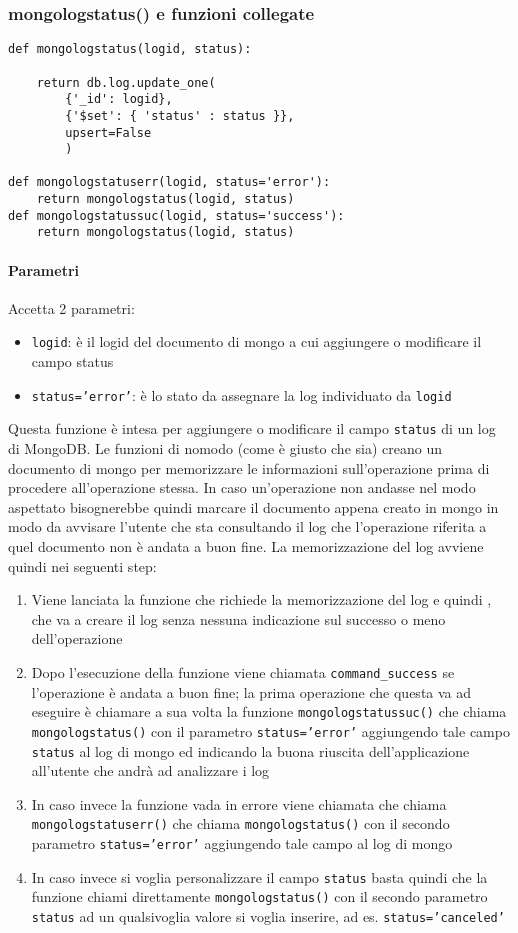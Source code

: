 \documentclass[11pt]{article}
\begin{document}
\subsubsection{mongologstatus() e funzioni collegate }\label{mongologstatus}
\begin{lstlisting}
def mongologstatus(logid, status):

    return db.log.update_one(
        {'_id': logid},
        {'$set': { 'status' : status }},
        upsert=False
        )
	
def mongologstatuserr(logid, status='error'):
    return mongologstatus(logid, status)
def mongologstatussuc(logid, status='success'):
    return mongologstatus(logid, status)
\end{lstlisting}
\paragraph{Parametri}
Accetta 2 parametri:
\begin{itemize}
	\item{\texttt{logid}: è il logid del documento di mongo a cui aggiungere o modificare il campo status}
	\item{\texttt{status='error'}: è lo stato da assegnare la log individuato da \texttt{logid}}
\end{itemize}
Questa funzione è intesa per aggiungere o modificare il campo \texttt{status} di un log di MongoDB. Le funzioni di nomodo (come è giusto che sia)
creano un documento di mongo per memorizzare le informazioni sull'operazione prima di procedere all'operazione stessa.
In caso un'operazione non andasse nel modo aspettato bisognerebbe quindi marcare il documento appena creato in mongo in modo da avvisare l'utente
che sta consultando il log che l'operazione riferita a quel documento non è andata a buon fine.
La memorizzazione del log avviene quindi nei seguenti step:
\begin{enumerate}
	\item{Viene lanciata la funzione che richiede la memorizzazione del log e quindi , che va a creare il log
		senza nessuna indicazione sul successo o meno dell'operazione}
	\item{Dopo l'esecuzione della funzione viene chiamata \texttt{command\string_success} se l'operazione è andata a buon fine;
		la prima operazione che questa va ad eseguire è chiamare a sua volta la funzione \texttt{mongologstatussuc()}
		che chiama \texttt{mongologstatus()} con il parametro \texttt{status='error'} aggiungendo tale campo \texttt{status} al log
		di mongo ed indicando la buona riuscita dell'applicazione all'utente che andrà ad analizzare i log}
	\item{In caso invece la funzione vada in errore viene chiamata  che chiama \texttt{mongologstatuserr()}
		che chiama \texttt{mongologstatus()} con il secondo parametro \texttt{status='error'} aggiungendo tale campo al log di mongo}
	\item{In caso invece si voglia personalizzare il campo \texttt{status} basta quindi che la funzione chiami direttamente \texttt{mongologstatus()}
		con il secondo parametro \texttt{status} ad un qualsivoglia valore si voglia inserire, ad es. \texttt{status='canceled'}}
\end{enumerate}
\end{document}
